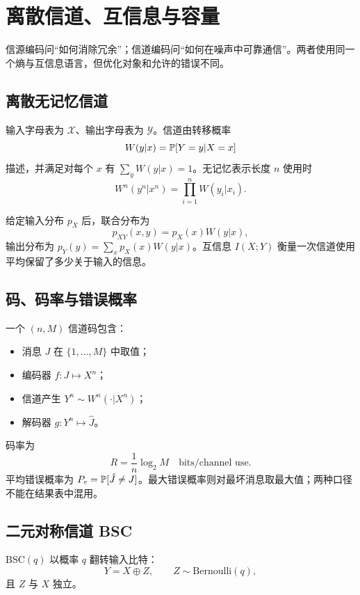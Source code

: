 \chapter{离散信道、互信息与容量}

信源编码问“如何消除冗余”；信道编码问“如何在噪声中可靠通信”。两者使用同一个熵与互信息语言，但优化对象和允许的错误不同。

\section{离散无记忆信道}

\begin{definition}[离散无记忆信道]
输入字母表为 $\mathcal X$、输出字母表为 $\mathcal Y$。信道由转移概率
\[
W(y|x)=\mathbb{P}[Y=y|X=x]
\]
描述，并满足对每个 $x$ 有 $\sum_yW(y|x)=1$。无记忆表示长度 $n$ 使用时
\[
W^n(y^n|x^n)=\prod_{i=1}^nW(y_i|x_i).
\]
\end{definition}

给定输入分布 $p_X$ 后，联合分布为
\[
p_{XY}(x,y)=p_X(x)W(y|x),
\]
输出分布为 $p_Y(y)=\sum_xp_X(x)W(y|x)$。互信息 $I(X;Y)$ 衡量一次信道使用平均保留了多少关于输入的信息。

\section{码、码率与错误概率}

一个 $(n,M)$ 信道码包含：
\begin{itemize}
  \item 消息 $J$ 在 $\{1,\dots,M\}$ 中取值；
  \item 编码器 $f:J\mapsto X^n$；
  \item 信道产生 $Y^n\sim W^n(\cdot|X^n)$；
  \item 解码器 $g:Y^n\mapsto\hat J$。
\end{itemize}
码率为
\[
R=\frac1n\log_2M\quad\text{bits/channel use}.
\]
平均错误概率为 $P_e=\mathbb{P}[\hat J\ne J]$。最大错误概率则对最坏消息取最大值；两种口径不能在结果表中混用。

\section{二元对称信道 BSC}

BSC$(q)$ 以概率 $q$ 翻转输入比特：
\[
Y=X\oplus Z,\qquad Z\sim\mathrm{Bernoulli}(q),
\]
且 $Z$ 与 $X$ 独立。

\begin{center}
\end{center}

